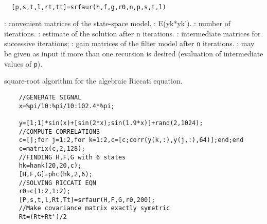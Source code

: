 
\begin{mandesc}
   \\ %
\end{mandesc}
\begin{calling_sequence}
\begin{verbatim}
  [p,s,t,l,rt,tt]=srfaur(h,f,g,r0,n,p,s,t,l)  
\end{verbatim}
\end{calling_sequence}
\begin{parameters}
  \begin{varlist}
    : convenient matrices of the state-space model.
    : E(yk*yk').
    : number of iterations.
    : estimate of the solution after n iterations.
    : intermediate matrices for  successive iterations;
    : gain matrices of the filter model after \verb!n! iterations.
    : may be given as input if more than one recursion is desired (evaluation of intermediate values of \verb!p!).
  \end{varlist}
\end{parameters}
\begin{mandescription}
  square-root algorithm for the algebraic Riccati equation.
\end{mandescription}
\begin{examples}
  \begin{Verbatim}
    //GENERATE SIGNAL
    x=%pi/10:%pi/10:102.4*%pi;

    y=[1;1]*sin(x)+[sin(2*x);sin(1.9*x)]+rand(2,1024);
    //COMPUTE CORRELATIONS
    c=[];for j=1:2,for k=1:2,c=[c;corr(y(k,:),y(j,:),64)];end;end
    c=matrix(c,2,128);
    //FINDING H,F,G with 6 states
    hk=hank(20,20,c);
    [H,F,G]=phc(hk,2,6);
    //SOLVING RICCATI EQN
    r0=c(1:2,1:2);
    [P,s,t,l,Rt,Tt]=srfaur(H,F,G,r0,200);
    //Make covariance matrix exactly symetric
    Rt=(Rt+Rt')/2
  \end{Verbatim}
\end{examples}
\begin{manseealso}
      
\end{manseealso}
